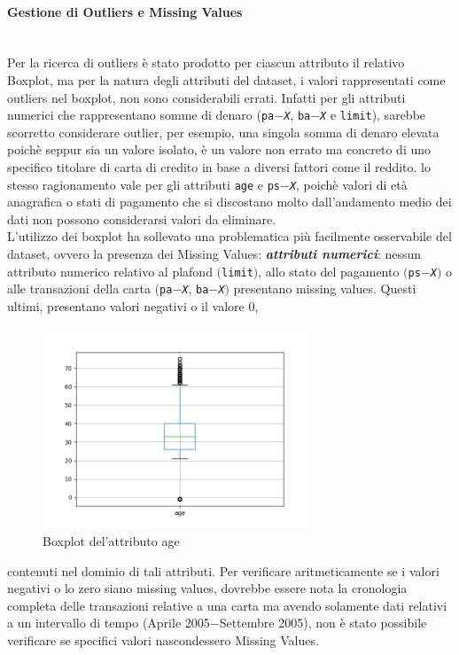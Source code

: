 \paragraph{Gestione di Outliers e Missing Values}\mbox{}\\
Per la ricerca di outliers è stato prodotto per ciascun attributo il relativo Boxplot, ma per la natura degli attributi del dataset, i valori rappresentati come outliers nel boxplot, non sono considerabili errati. Infatti per gli attributi numerici che rappresentano somme di denaro (\texttt{pa$-$\textit{X}}, \texttt{ba$-$\textit{X}} e \texttt{limit}), sarebbe scorretto considerare outlier, per esempio, una singola somma di denaro elevata poichè seppur sia un valore isolato, è un valore non errato ma concreto di uno specifico titolare di carta di credito in base a diversi fattori come il reddito. lo stesso ragionamento vale per gli attributi \texttt{age} e  \texttt{ps$-$\textit{X}}, poichè valori di età anagrafica o stati di pagamento che si discostano molto dall'andamento medio dei dati non possono considerarsi valori da eliminare.\\
L’utilizzo dei boxplot ha sollevato una problematica più facilmente osservabile del dataset, ovvero la presenza dei Missing Values:
\newpage
\textit{\textbf{attributi numerici}}: 
 nessun attributo numerico relativo al plafond $($\texttt{limit}$)$, allo stato del pagamento $($\texttt{ps$-$\textit{X}}$)$ o alle transazioni della carta $($\texttt{pa$-$\textit{X}}, \texttt{ba$-$\textit{X}}$)$ presentano missing values. Questi ultimi, presentano valori negativi o il valore 0, 
\begin{figure}
\centering
\includegraphics[width=8cm]{img/age-boxplot.png}
\caption{Boxplot del'attributo age}
\end{figure}
contenuti nel dominio di tali attributi. Per verificare aritmeticamente se i valori negativi o lo zero siano missing values, dovrebbe essere nota la cronologia completa delle transazioni relative a una carta ma avendo solamente dati relativi a un intervallo di tempo (Aprile 2005$-$Settembre 2005), non è stato possibile verificare se specifici valori nascondessero Missing Values.

